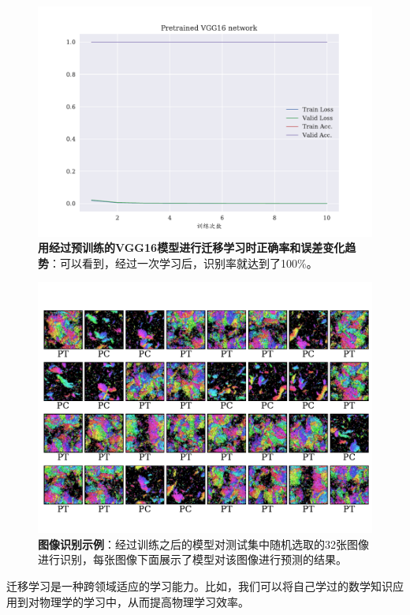 \begin{figure}[H]
	\centering
	\includegraphics[width=0.95\linewidth]{../figures/classifier/3.pdf}
	\caption{\textbf{用经过预训练的VGG16模型进行迁移学习时正确率和误差变化趋势}：可以看到，经过一次学习后，识别率就达到了100\%。}
	\label{fig:c3}
\end{figure}

\begin{figure}[H]
	\centering
	\includegraphics[width=\linewidth]{../figures/classifier/示例.pdf}
	\caption{\textbf{图像识别示例}：经过训练之后的模型对测试集中随机选取的32张图像进行识别，每张图像下面展示了模型对该图像进行预测的结果。}
	\label{fig:cexample}
\end{figure}

迁移学习是一种跨领域适应的学习能力\cite{DL}。比如，我们可以将自己学过的数学知识应用到对物理学的学习中，从而提高物理学习效率。

